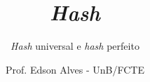 \title{\textit{Hash}}
\subtitle{\textit{Hash} universal e \textit{hash} perfeito}
\author{Prof. Edson Alves - UnB/FCTE}
\date{}
